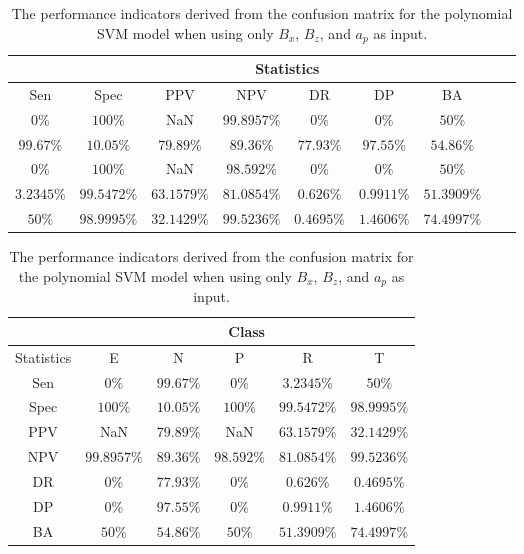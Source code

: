 \begin{table}[!ht]
	\centering
	\begin{tabular}{|c|c|c|c|c|c|c|c|c|}
		\hline
		 & \multicolumn{7}{c|}{Statistics} \\ \hline
		Sen & Spec & PPV & NPV & DR & DP & BA \\ \hline
		$0\%$ & $100\%$ & NaN & $99.8957\%$ & $0\%$ & $0\%$ & $50\%$ \\ \hline
		$99.67\%$ & $10.05\%$ & $79.89\%$ & $89.36\%$ & $77.93\%$ & $97.55\%$ & $54.86\%$ \\ \hline
		$0\%$ & $100\%$ & NaN & $98.592\%$ & $0\%$ & $0\%$ & $50\%$ \\ \hline
		$3.2345\%$ & $99.5472\%$ & $63.1579\%$ & $81.0854\%$ & $0.626\%$ & $0.9911\%$ & $51.3909\%$ \\ \hline
		$50\%$ & $98.9995\%$ & $32.1429\%$ & $99.5236\%$ & $0.4695\%$ & $1.4606\%$ & $74.4997\%$ \\ \hline
	\end{tabular}
	\caption{The performance indicators derived from the confusion matrix for the polynomial SVM model when using only $B_{x}$, $B_{z}$, and $a_{p}$ as input.}
	\label{tab:cs:xzap:svmPoly}
\end{table}

\begin{table}[!ht]
	\centering
	\begin{tabular}{|c|c|c|c|c|c|}
		\hline
		 & \multicolumn{5}{c|}{Class} \\ \hline
		Statistics & E & N & P & R & T \\ \hline
		Sen & $0\%$ & $99.67\%$ & $0\%$ & $3.2345\%$ & $50\%$ \\ \hline
		Spec & $100\%$ & $10.05\%$ & $100\%$ & $99.5472\%$ & $98.9995\%$ \\ \hline
		PPV & NaN & $79.89\%$ & NaN & $63.1579\%$ & $32.1429\%$ \\ \hline
		NPV & $99.8957\%$ & $89.36\%$ & $98.592\%$ & $81.0854\%$ & $99.5236\%$ \\ \hline
		DR & $0\%$ & $77.93\%$ & $0\%$ & $0.626\%$ & $0.4695\%$ \\ \hline
		DP & $0\%$ & $97.55\%$ & $0\%$ & $0.9911\%$ & $1.4606\%$ \\ \hline
		BA & $50\%$ & $54.86\%$ & $50\%$ & $51.3909\%$ & $74.4997\%$ \\ \hline
	\end{tabular}
	\caption{The performance indicators derived from the confusion matrix for the polynomial SVM model when using only $B_{x}$, $B_{z}$, and $a_{p}$ as input.}
	\label{tab:cs:reverse:xzap:svmPoly}
\end{table}

